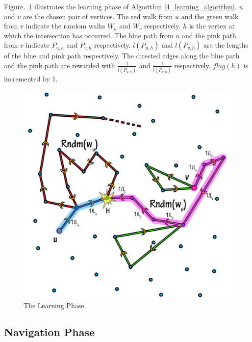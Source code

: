 \documentclass[10pt, conference, compsocconf]{IEEEtran}
\begin{document}
Figure.~\ref{4_learning_phase_diag} illustrates the learning phase of Algorithm \ref{4_learning_algorithm}. $u$ and $v$ are the chosen pair of vertices. The red walk from $u$ and the green walk from $v$ indicate the random walks $W_u$ and $W_v$ respectively. $h$ is the vertex at which the intersection has occurred. The blue path from $u$ and the pink path from $v$ indicate $P_{u,h}$ and $P_{v,h}$ respectively. $l(P_{u,h})$ and $l(P_{v,h})$ are the lengths of the blue and pink path respectively. The directed edges along the blue path and the pink path are rewarded with $\frac{1}{l(P_{u,h})}$ and $\frac{1}{l(P_{v,h})}$ respectively. $flag(h)$ is incremented by 1.\\

\begin{figure}[htp]
\centering
\includegraphics[scale=0.13]{Results/LearningComponent.jpg}
\caption{The Learning Phase}
\label{4_learning_phase_diag}
\end{figure}


\subsection{Navigation Phase}
\label{sec:4_navigation_phase}
\end{document}
